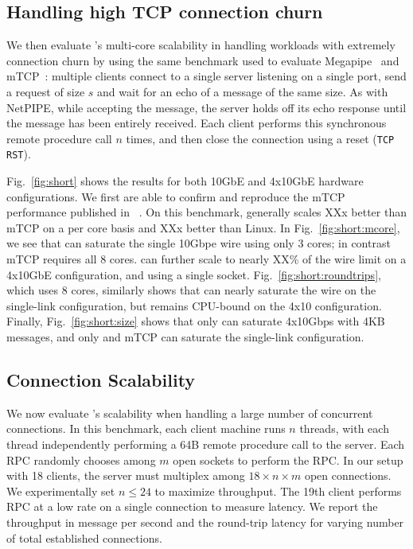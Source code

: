 

\subsection{Handling high TCP connection churn}
\label{sec:eval:short}



We then evaluate \ix's multi-core scalability in handling workloads
with extremely connection churn by using the same benchmark used to evaluate
Megapipe~\cite{han2012megapipe} and mTCP~\cite{jeong2014mtcp}:
multiple clients connect to a single server listening on a single
port, send a request of size $s$ and wait for an echo of a message of
the same size.  As with NetPIPE, while accepting the message, the server holds off its
echo response until the message has been entirely received.
Each client performs this synchronous remote procedure
call $n$ times, and then close the connection using a reset
(\texttt{TCP RST}).


 Fig.~\ref{fig:short} shows the results for both
10GbE and 4x10GbE hardware configurations.  We first
are able to confirm and reproduce the mTCP performance published in
~\cite{jeong2014mtcp}.  On this benchmark, \ix generally scales XXx
better than mTCP on a per core basis and XXx better than Linux.  In
Fig.~\ref{fig:short:mcore}, we see that \ix can saturate the single
10Gbpe wire using only 3 cores; in contrast mTCP requires all 8
cores. \ix can further scale to nearly XX\% of the wire limit on a
4x10GbE configuration, and using a single socket.
Fig.~\ref{fig:short:roundtrips}, which uses 8 cores, similarly shows
that \ix can nearly saturate the wire on the single-link
configuration, but remains CPU-bound on the 4x10 configuration.
Finally, Fig.~\ref{fig:short:size} shows that only \ix can saturate
4x10Gbps with 4KB messages, and only \ix and mTCP can saturate the
single-link configuration.


\subsection{Connection Scalability}


\label{sec:eval:scale}

We now evaluate \ix's scalability when handling a large number of
concurrent connections. In this benchmark, each client machine runs
$n$ threads, with each thread independently performing a 64B remote
procedure call to the server.  Each RPC randomly chooses among $m$
open sockets to perform the RPC.  In our setup with 18 clients, the
server must multiplex among $18 \times n \times m$ open connections.
We experimentally set $n \leq 24$ to maximize throughput.  The 19th
client performs RPC at a low rate on a single connection to measure
latency.  We report the throughput in message per second and the
round-trip latency for varying number of total established connections.

